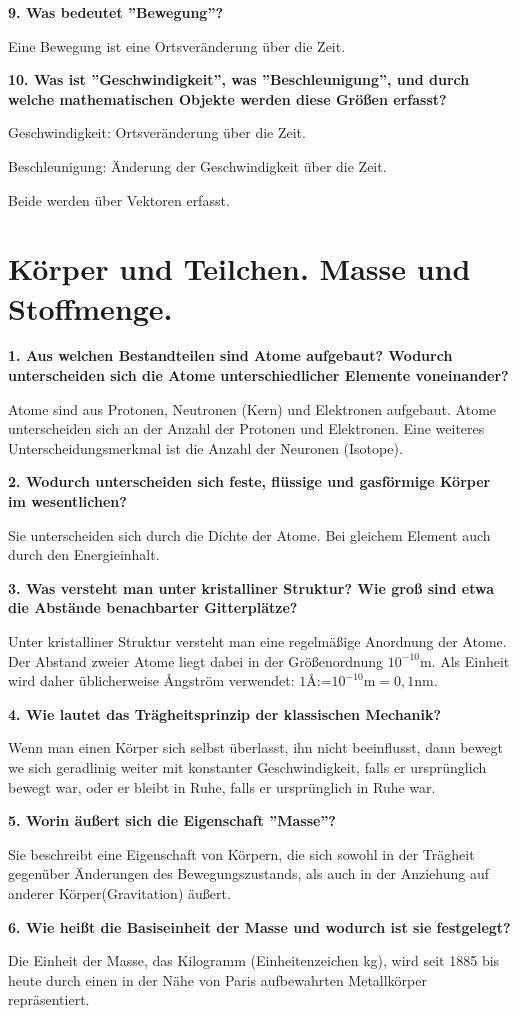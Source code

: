 \documentclass[12pt,a4paper,twoside]{book}
\newcommand{\nqu}[1]{\vspace*{10mm} \noindent \textbf{#1} \par \vspace*{1mm}}
\begin{document}
\nqu{9. Was bedeutet ''Bewegung''?}
Eine Bewegung ist eine Ortsveränderung über die Zeit.

\nqu{10. Was ist ''Geschwindigkeit'', was ''Beschleunigung'', und durch welche mathematischen Objekte werden diese Größen erfasst?}
Geschwindigkeit: Ortsveränderung über die Zeit.

Beschleunigung: Änderung der Geschwindigkeit über die Zeit.

Beide werden über Vektoren erfasst.


\chapter{Körper und Teilchen. Masse und Stoffmenge.}

\nqu{1. Aus welchen Bestandteilen sind Atome aufgebaut? Wodurch unterscheiden sich die Atome unterschiedlicher Elemente voneinander?}
Atome sind aus Protonen, Neutronen (Kern) und Elektronen aufgebaut.
Atome unterscheiden sich an der Anzahl der Protonen und Elektronen. Eine weiteres Unterscheidungsmerkmal ist die Anzahl der Neuronen (Isotope).

\nqu{2. Wodurch unterscheiden sich feste, flüssige und gasförmige Körper im wesentlichen?}
Sie unterscheiden sich durch die Dichte der Atome.
Bei gleichem Element auch durch den Energieinhalt.

\nqu{3. Was versteht man unter kristalliner Struktur? Wie groß sind etwa die Abstände benachbarter Gitterplätze?}
Unter kristalliner Struktur versteht man eine regelmäßige Anordnung der Atome.
Der Abstand zweier Atome liegt dabei in der Größenordnung $10^{-10}$m. Als Einheit wird daher üblicherweise {\AA}ngström verwendet: $1${\AA}:=$10^{-10}$m$ = 0,1$nm.

\nqu{4. Wie lautet das Trägheitsprinzip der klassischen Mechanik?}
Wenn man einen Körper sich selbst überlasst, ihn nicht beeinflusst, dann bewegt we sich geradlinig weiter mit konstanter Geschwindigkeit, falls er ursprünglich bewegt war, oder er bleibt in Ruhe, falls er ursprünglich in Ruhe war.

\nqu{5. Worin äußert sich die Eigenschaft ''Masse''?}
Sie beschreibt eine Eigenschaft von Körpern, die sich sowohl in der Trägheit gegenüber Änderungen des Bewegungszustands, als auch in der Anziehung auf anderer Körper(Gravitation) äußert.

\nqu{6. Wie heißt die Basiseinheit der Masse und wodurch ist sie festgelegt?}
Die Einheit der Masse, das Kilogramm (Einheitenzeichen kg), wird seit 1885 bis heute durch einen in der Nähe von Paris aufbewahrten Metallkörper repräsentiert.
\end{document}
